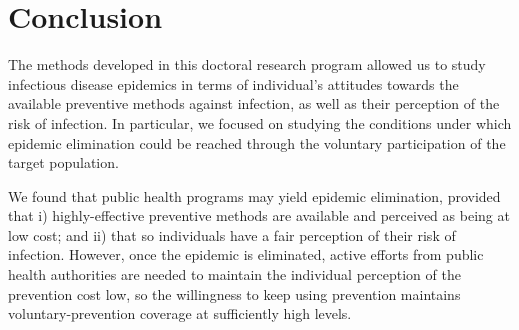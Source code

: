 \section{Conclusion}
The methods developed in this doctoral research program allowed us to study infectious disease epidemics in terms of individual's attitudes towards the available preventive methods against infection, as well as their perception of the risk of infection. In particular, we focused on studying the conditions under which epidemic elimination could be reached through the voluntary participation of the target population.

We found that public health programs may yield epidemic elimination, provided that i) highly-effective preventive methods are available and perceived as being at low cost; and ii) that so individuals have a fair perception of their risk of infection. However, once the epidemic is eliminated, active efforts from public health authorities are needed to maintain the individual perception of the prevention cost low, so the willingness to keep using prevention maintains voluntary-prevention coverage at sufficiently high levels.